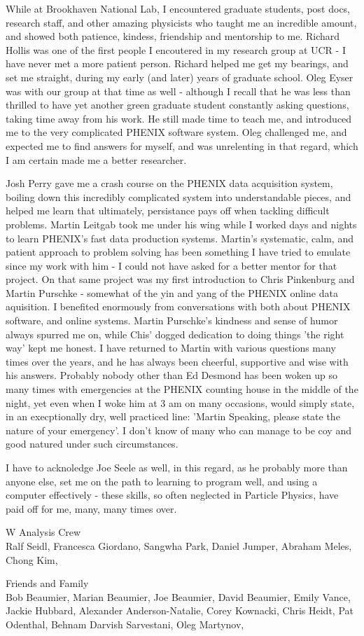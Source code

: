 While at Brookhaven National Lab, I encountered graduate students, post docs,
research staff, and other amazing physicists who taught me an incredible
amount, and showed both patience, kindess, friendship and mentorship to me.
Richard Hollis was one of the first people I encoutered in my research group at
UCR - I have never met a more patient person. Richard helped me get my
bearings, and set me straight, during my early (and later) years of graduate
school. Oleg Eyser was with our group at that time as well - although I recall
that he was less than thrilled to have yet another green graduate student
constantly asking questions, taking time away from his work. He still made time
to teach me, and introduced me to the very complicated PHENIX software system.
Oleg challenged me, and expected me to find answers for myself, and was
unrelenting in that regard, which I am certain made me a better researcher.

Josh Perry gave me a crash course on the PHENIX data acquisition system,
boiling down this incredibly complicated system into understandable pieces, and
helped me learn that ultimately, persistance pays off when tackling difficult
problems. Martin Leitgab took me under his wing while I worked days and nights
to learn PHENIX's fast data production systems. Martin's systematic, calm, and
patient approach to problem solving has been something I have tried to emulate
since my work with him - I could not have asked for a better mentor for that
project. On that same project was my first introduction to Chris Pinkenburg and
Martin Purschke - somewhat of the yin and yang of the PHENIX online data
aquisition. I benefited enormously from conversations with both about PHENIX
software, and online systems. Martin Purschke's kindness and sense of humor
always spurred me on, while Chis' dogged dedication to doing things 'the right
way' kept me honest. I have returned to Martin with various questions many
times over the years, and he has always been cheerful, supportive and wise with
his answers. Probably nobody other than Ed Desmond has been woken up so many
times with emergencies at the PHENIX counting house in the middle of the night,
yet even when I woke him at 3 am on many occasions, would simply state, in an
execptionally dry, well practiced line: 'Martin Speaking, please state the
nature of your emergency'. I don't know of many who can manage to be coy and
good natured under such circumstances.

I have to acknoledge Joe Seele as well, in this regard, as he probably more
than anyone else, set me on the path to learning to program well, and using a
computer effectively - these skills, so often neglected in Particle Physics,
have paid off for me, many, many times over.

W Analysis Crew \\
  Ralf Seidl, 
  Francesca Giordano, 
  Sangwha Park, 
  Daniel Jumper, 
  Abraham Meles,
  Chong Kim, 

Friends and Family \\
  Bob Beaumier, 
  Marian Beaumier, 
  Joe Beaumier, 
  David Beaumier, 
  Emily Vance, 
  Jackie Hubbard, 
  Alexander Anderson-Natalie, 
  Corey Kownacki, 
  Chris Heidt, 
  Pat Odenthal, 
  Behnam Darvish Sarvestani, 
  Oleg Martynov, 
